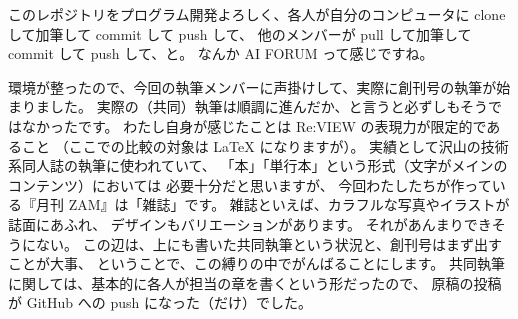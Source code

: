 \documentclass[dvipdfmx,autodetect-engine,10pt,b5paper,papersize,openany,dvipsnames]{jsbook}
\begin{document}
\begin{multicols}{2}
このレポジトリをプログラム開発よろしく、各人が自分のコンピュータに
clone して加筆して commit して push して、
他のメンバーが pull して加筆して commit して push して、と。
なんか AI FORUM って感じですね。


\vspace{7.0cm}

環境が整ったので、今回の執筆メンバーに声掛けして、実際に創刊号の執筆が始まりました。
実際の（共同）執筆は順調に進んだか、と言うと必ずしもそうではなかったです。
わたし自身が感じたことは Re:VIEW の表現力が限定的であること
（ここでの比較の対象は \LaTeX{} になりますが）。
実績として沢山の技術系同人誌の執筆に使われていて、
「本」「単行本」という形式（文字がメインのコンテンツ）においては
必要十分だと思いますが、
今回わたしたちが作っている『月刊 ZAM』は「雑誌」です。
雑誌といえば、カラフルな写真やイラストが誌面にあふれ、
デザインもバリエーションがあります。
それがあんまりできそうにない。
この辺は、上にも書いた共同執筆という状況と、創刊号はまず出すことが大事、
ということで、この縛りの中でがんばることにします。
共同執筆に関しては、基本的に各人が担当の章を書くという形だったので、
原稿の投稿が GitHub への push になった（だけ）でした。



\end{multicols}
\end{document}

